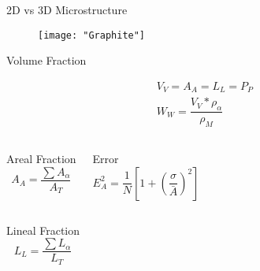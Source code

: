 \documentclass[10pt]{beamer}
\begin{document}
{%
\begin{frame}[fragile]{2D vs 3D Microstructure}

\begin{figure}[H]
\texttt{[image: "Graphite"]}

\end{figure}
    
\end{frame}
}
{%
\begin{frame}[fragile]{Volume Fraction}

\begin{equation*}
\begin{gathered}
V_{V} = A_{A} = L_{L} = P_{P} \\
W_{W} = \dfrac{V_{V} * \rho_{\alpha}}{\rho_{M}}
\end{gathered}
\end{equation*}


  \begin{columns}[T,onlytextwidth]
 
\begin{block}{Areal Fraction}
\begin{equation*}
A_{A} = \dfrac{\sum A_{\alpha}}{A_{T}}
\end{equation*} 
\end{block}
 

\begin{block}{Error}
\begin{equation*}
E_{A}^{2} = \dfrac{1}{N}\left[ 1+ \left( \dfrac{\sigma}{\bar{A}} \right)^{2} \right]
\end{equation*} 
\end{block}

\end{columns}

  \begin{columns}[T,onlytextwidth]
\begin{block}{Lineal Fraction}
\begin{equation*}
L_{L} = \dfrac{\sum L_{\alpha}}{L_{T}}
\end{equation*} 
\end{block}
 

\end{columns}
\end{frame}}
\end{document}
